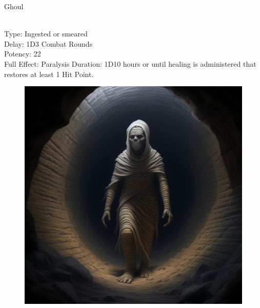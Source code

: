 \begin{monsterbox}{Ghoul}
\begin{rpg-monsteraction}
	\end{rpg-monsteraction}
	\begin{rpg-monsteraction}
		\\Type: Ingested or smeared\\
		Delay: 1D3 Combat Rounds\\
                Potency: 22\\
		Full Effect: Paralysis
		Duration: 1D10 hours or until healing is administered that restores at least 1 Hit Point.
	\end{rpg-monsteraction}
\end{monsterbox}
	

\begin{figure}[h]
\begin{center}
\includegraphics[scale=0.24]{img/ai-images/mummy.png}
\end{center}
\end{figure}
